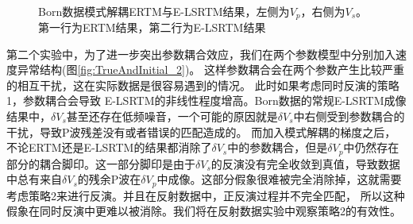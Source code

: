 \begin{figure}[!htb]
   \centering
   \\
   \caption{Born数据模式解耦ERTM与E-LSRTM结果，左侧为$V_p$，右侧为$V_s$。第一行为ERTM结果，第二行为E-LSRTM结果}
   \label{fig:decomp_2}
\end{figure}
第二个实验中，为了进一步突出参数耦合效应，我们在两个参数模型中分别加入速度异常结构(图\ref{fig:TrueAndInitial_2})。
这样参数耦合会在两个参数产生比较严重的相互干扰，这在实际数据是很容易遇到的情况。
此时如果考虑同时反演的策略1，参数耦合会导致
E-LSRTM的非线性程度增高。Born数据的常规E-LSRTM成像结果中，$\delta
V_s$甚至还存在低频噪音，一个可能的原因就是$\delta V_s$中右侧受到参数耦合的干扰，导致P波残差没有或者错误的匹配造成的。
而加入模式解耦的梯度之后，不论ERTM还是E-LSRTM的结果都消除了$\delta
V_s$中的参数耦合，但是$\delta
V_p$中仍然存在部分的耦合脚印。这一部分脚印是由于$\delta
V_s$的反演没有完全收敛到真值，导致数据中总有来自$\delta V_s$的残余P波在$\delta
V_p$中成像。这部分假象很难被完全消除掉，这就需要考虑策略2来进行反演。并且在反射数据中，正反演过程并不完全匹配，
所以这种假象在同时反演中更难以被消除。我们将在反射数据实验中观察策略2的有效性。


